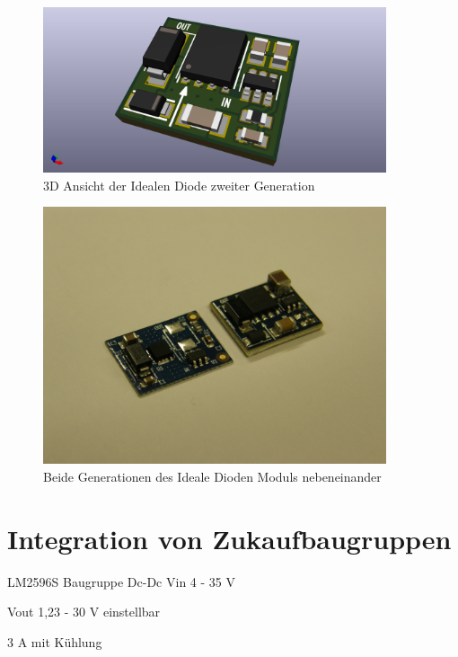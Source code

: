 \begin{figure}[H]
\centering
\includegraphics[width=0.9\textwidth]{bilder/Ideale_Diode/Ideale_Diode_25V_rev00_ver00-3D.png} 
\caption{3D Ansicht der Idealen Diode zweiter Generation} 
\label{fig:3D Ansicht der Idealen Diode zweiter Generation}
\end{figure}


\begin{figure}[H]
\centering
\includegraphics[width=0.9\textwidth]{bilder/Ideale_Diode/Ideale_Dioden_Paar_dreiviertel.jpg} 
\caption{Beide Generationen des Ideale Dioden Moduls nebeneinander} 
\label{fig:Beide Generationen des Ideale Dioden Moduls nebeneinander}
\end{figure}

\section{Integration von Zukaufbaugruppen}


LM2596S  Baugruppe Dc-Dc 
Vin 4 - 35 V 

Vout 1,23 - 30 V einstellbar

3 A  mit Kühlung

